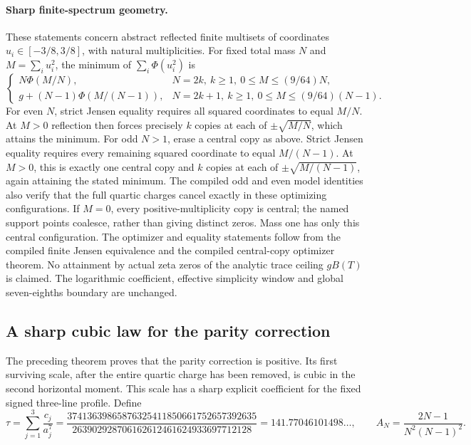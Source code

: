 \paragraph{Sharp finite-spectrum geometry.}
These statements concern abstract reflected finite multisets of
coordinates \(u_i\in[-3/8,3/8]\), with natural multiplicities.
For fixed total mass \(N\) and \(M=\sum_i u_i^2\), the minimum of
\(\sum_i\Phi(u_i^2)\) is
\[
 \begin{cases}
  N\Phi(M/N),&N=2k,\ k\ge1,\ 0\le M\le(9/64)N,\\
  g+(N-1)\Phi(M/(N-1)),&N=2k+1,\ k\ge1,
       \ 0\le M\le(9/64)(N-1).
 \end{cases}
\]
For even \(N\), strict Jensen equality requires all squared coordinates
to equal \(M/N\).  At \(M>0\) reflection then forces precisely \(k\)
copies at each of \(\pm\sqrt{M/N}\), which attains the minimum.
For odd \(N>1\), erase a central copy as above.  Strict Jensen equality
requires every remaining squared coordinate to equal \(M/(N-1)\).
At \(M>0\), this is exactly one central copy and \(k\) copies at each
of \(\pm\sqrt{M/(N-1)}\), again attaining the stated minimum.
The compiled odd and even model identities also verify that the full
quartic charges cancel exactly in these optimizing configurations.
If \(M=0\), every positive-multiplicity copy is central; the named
support points coalesce, rather than giving distinct zeros.
Mass one has only this central configuration.  The optimizer and equality
statements follow from the compiled finite Jensen equivalence and the
compiled central-copy optimizer theorem.  No attainment by actual zeta
zeros of the analytic trace ceiling \(gB(T)\) is claimed.
The logarithmic coefficient, effective simplicity window and global
seven-eighths boundary are unchanged.

\subsection{A sharp cubic law for the parity correction}
\label{sec:cubic-parity-geometry}

The preceding theorem proves that the parity correction is positive.
Its first surviving scale, after the entire quartic charge has been
removed, is cubic in the second horizontal moment.  This scale has a
sharp explicit coefficient for the fixed signed three-line profile.
Define
\[
 \tau=\sum_{j=1}^3\frac{c_j}{a_j^7}
 =\frac{37413639865876325411850661752657392635}
 {263902928706162612461624933697712128}
 =141.77046101498\ldots,
 \qquad A_N=\frac{2N-1}{N^2(N-1)^2}.
\]

